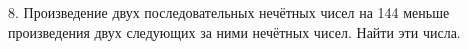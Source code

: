 8. Произведение двух последовательных нечётных чисел на 144 меньше произведения двух следующих за ними нечётных чисел. Найти эти числа.\\

